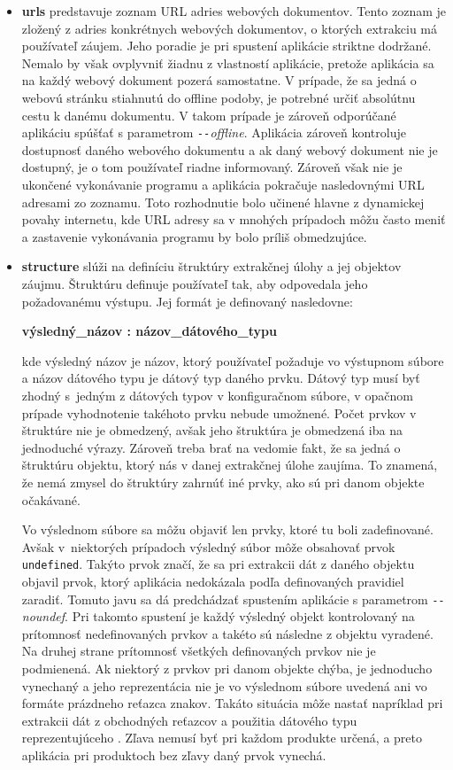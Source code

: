 \begin{itemize}
  \item \textbf{urls} predstavuje zoznam URL adries webových dokumentov. Tento zoznam je zložený z adries konkrétnych webových dokumentov, o ktorých extrakciu má používateľ záujem. Jeho poradie je pri spustení aplikácie striktne dodržané. Nemalo by však ovplyvniť žiadnu z vlastností aplikácie, pretože aplikácia sa na každý webový dokument pozerá samostatne. V prípade, že sa jedná o webovú stránku stiahnutú do offline podoby, je potrebné určiť absolútnu cestu k danému dokumentu. V takom prípade je zároveň odporúčané aplikáciu spúšťať s parametrom \textit{\texttt{-{}-}offline}. Aplikácia zároveň kontroluje dostupnosť daného webového dokumentu a ak daný webový dokument nie je dostupný, je o tom používateľ riadne informovaný. Zároveň však nie je ukončené vykonávanie programu a aplikácia pokračuje nasledovnými URL adresami zo zoznamu. Toto rozhodnutie bolo učinené hlavne z dynamickej povahy internetu, kde URL adresy sa v mnohých prípadoch môžu často meniť a zastavenie vykonávania programu by bolo príliš obmedzujúce. 
  
  \item \textbf{structure} slúži na definíciu štruktúry extrakčnej úlohy a jej objektov záujmu. Štruktúru definuje používateľ tak, aby odpovedala jeho požadovanému výstupu. Jej formát je definovaný nasledovne:
  
  \textbf{výsledný\_názov : názov\_dátového\_typu}
  
  kde výsledný názov je názov, ktorý používateľ požaduje vo výstupnom súbore a názov dátového typu je  dátový typ daného prvku. Dátový typ musí byť zhodný s~jedným z dátových typov v konfiguračnom súbore, v opačnom prípade vyhodnotenie takéhoto prvku nebude umožnené. Počet prvkov v štruktúre nie je obmedzený, avšak jeho štruktúra je obmedzená iba na jednoduché výrazy. Zároveň treba brať na vedomie fakt, že sa jedná o štruktúru objektu, ktorý nás v danej extrakčnej úlohe zaujíma. To znamená, že nemá zmysel do štruktúry zahrnúť iné prvky, ako sú pri danom objekte očakávané.
  
  Vo výslednom súbore sa môžu objaviť len prvky, ktoré tu boli zadefinované. Avšak v~niektorých prípadoch výsledný súbor môže obsahovať prvok \texttt{undefined}. Takýto prvok značí, že sa pri extrakcii dát z daného objektu objavil prvok, ktorý aplikácia nedokázala podľa definovaných pravidiel zaradiť. Tomuto javu sa dá predchádzať spustením aplikácie s parametrom \textit{\texttt{-{}-}noundef}. Pri takomto spustení je každý výsledný objekt kontrolovaný na prítomnosť nedefinovaných prvkov a takéto sú následne z objektu vyradené. Na druhej strane prítomnosť všetkých definovaných prvkov nie je podmienená. Ak niektorý z prvkov pri danom objekte chýba, je jednoducho vynechaný a jeho reprezentácia nie je vo výslednom súbore uvedená ani vo formáte prázdneho reťazca znakov. Takáto situácia môže nastať napríklad pri extrakcii dát z obchodných reťazcov a použitia dátového typu reprezentujúceho . Zľava nemusí byť pri každom produkte určená, a preto aplikácia pri produktoch bez zľavy daný prvok vynechá.
  

\end{itemize}
